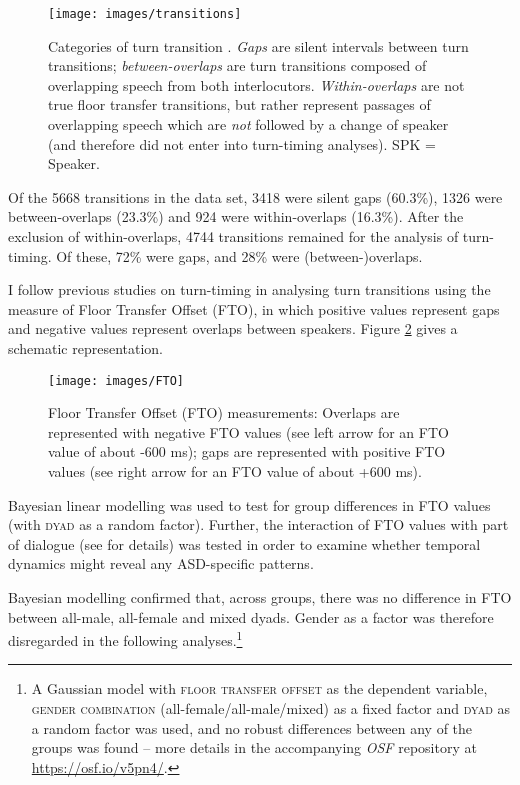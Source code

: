 \begin{figure}

{\centering \texttt{[image: images/transitions]} 
	
}

\caption{Categories of turn transition \citep[adapted from][]{levinsonTimingTurntakingIts2015a}. \textit{Gaps} are silent intervals between turn transitions; \textit{between-overlaps} are turn transitions composed of overlapping speech from both interlocutors. \textit{Within-overlaps} are not true floor transfer transitions, but rather represent passages of overlapping speech which are \emph{not} followed by a change of speaker (and therefore did not enter into turn-timing analyses). SPK = Speaker.}\label{fig:Transitions}
\end{figure}

Of the 5668 transitions in the data set, 3418 were silent gaps (60.3\%), 1326 were between-overlaps (23.3\%) and 924 were within-overlaps (16.3\%).
After the exclusion of within-overlaps, 4744 transitions remained for the analysis of turn-timing. Of these, 72\% were gaps, and 28\% were (between-)overlaps.

I follow previous studies on turn-timing in analysing turn transitions using the measure of Floor Transfer Offset (FTO), in which positive values represent gaps and negative values represent overlaps between speakers. Figure \ref{fig:FTO} gives a schematic representation.



\begin{figure}

{\centering \texttt{[image: images/FTO]} 
	
}

\caption{Floor Transfer Offset (FTO) measurements: Overlaps are represented with negative FTO values (see left arrow for an FTO value of about -600 ms); gaps are represented with positive FTO values (see right arrow for an FTO value of about +600 ms).}\label{fig:FTO}
\end{figure}

Bayesian linear modelling was used to test for group differences in FTO values (with \textsc{dyad} as a random factor).
Further, the interaction of FTO values with part of dialogue (see  for details) was tested in order to examine whether temporal dynamics might reveal any ASD-specific patterns.

Bayesian modelling confirmed that, across groups, there was no difference in FTO between all-male, all-female and mixed dyads. Gender as a factor was therefore disregarded in the following analyses.\footnote{A Gaussian model with \textsc{floor transfer offset} as the dependent variable, \textsc{gender combination} (all-female/all-male/mixed) as a fixed factor and \textsc{dyad} as a random factor was used, and no robust differences between any of the groups was found -- more details in the accompanying \emph{OSF} repository at \url{https://osf.io/v5pn4/}.}





